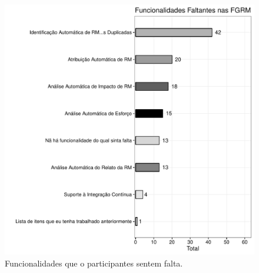 

\begin{figure}[htpb]
	\centering
	\includegraphics[width=0.7\linewidth]{./chapter-pesquisa-com-profissionais/img/grafico_melhorias_fgrm_funcionalidades_faltantes.pdf}
	\caption{Funcionalidades que o participantes sentem falta.}
\label{fig:grafico_melhorias_fgrm_funcionalidades_falantes}
\end{figure}

